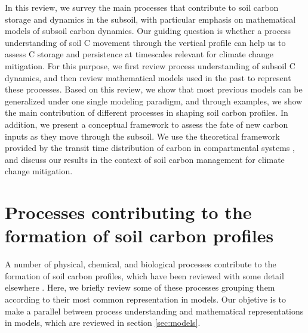 \documentclass[11pt, oneside, a4paper]{article}   	%
\begin{document}
In this review, we survey the main processes that contribute to soil carbon storage and dynamics in the subsoil, with particular emphasis on mathematical models of subsoil carbon dynamics. 
Our guiding question is whether a process understanding of soil C movement through the vertical profile can help us to assess C storage and persistence at timescales relevant for climate change mitigation. 
For this purpose, we first review process understanding of subsoil C dynamics, and then review mathematical models used in the past to represent these processes. Based on this review, we show that most previous models can be generalized under one single modeling paradigm, and through examples, we show the main contribution of different processes in shaping soil carbon profiles. 
In addition, we present a conceptual framework to assess the fate of new carbon inputs as they move through the subsoil. We use the theoretical framework provided by the transit time distribution of carbon in compartmental systems \citep{Sierra2017GCB, Sierra2018GBC, Metzler2018MG}, and discuss our results in the context of  soil carbon management for climate change mitigation.

\section{Processes contributing to the formation of soil carbon profiles}
A number of physical, chemical, and biological processes contribute to the formation of soil carbon profiles, which have been reviewed with some detail elsewhere \citep[e.g.][]{Button2022,HicksPries2023}. Here, we briefly review some of these processes grouping them according to their most common representation in models. Our objetive is to make a parallel between process understanding and mathematical representations in models, which are reviewed in section \ref{sec:models}.
\end{document}
